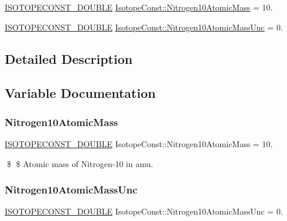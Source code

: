 \begin{DoxyCompactItemize}
\item 
\mbox{\hyperlink{group___isotope_const-_macros_ga8f45a7272ce02c0b4c65c44636ed719a}{I\+S\+O\+T\+O\+P\+E\+C\+O\+N\+S\+T\+\_\+\+D\+O\+U\+B\+LE}} \mbox{\hyperlink{group___isotope_const-_nitrogen-_n10_ga37747b6676fe4e88cf44adf99983e192}{Isotope\+Const\+::\+Nitrogen10\+Atomic\+Mass}} = 10.
\item 
\mbox{\hyperlink{group___isotope_const-_macros_ga8f45a7272ce02c0b4c65c44636ed719a}{I\+S\+O\+T\+O\+P\+E\+C\+O\+N\+S\+T\+\_\+\+D\+O\+U\+B\+LE}} \mbox{\hyperlink{group___isotope_const-_nitrogen-_n10_gaa5e66ec3d050878abecbff5ad2c30d71}{Isotope\+Const\+::\+Nitrogen10\+Atomic\+Mass\+Unc}} = 0.
\end{DoxyCompactItemize}


\subsection{Detailed Description}


\subsection{Variable Documentation}
\mbox{\label{group___isotope_const-_nitrogen-_n10_ga37747b6676fe4e88cf44adf99983e192}} 
\subsubsection{\texorpdfstring{Nitrogen10\+Atomic\+Mass}{Nitrogen10AtomicMass}}
{\footnotesize\ttfamily \mbox{\hyperlink{group___isotope_const-_macros_ga8f45a7272ce02c0b4c65c44636ed719a}{I\+S\+O\+T\+O\+P\+E\+C\+O\+N\+S\+T\+\_\+\+D\+O\+U\+B\+LE}} Isotope\+Const\+::\+Nitrogen10\+Atomic\+Mass = 10.}

\$ \$ Atomic mass of Nitrogen-\/10 in amu. \mbox{\label{group___isotope_const-_nitrogen-_n10_gaa5e66ec3d050878abecbff5ad2c30d71}} 
\subsubsection{\texorpdfstring{Nitrogen10\+Atomic\+Mass\+Unc}{Nitrogen10AtomicMassUnc}}
{\footnotesize\ttfamily \mbox{\hyperlink{group___isotope_const-_macros_ga8f45a7272ce02c0b4c65c44636ed719a}{I\+S\+O\+T\+O\+P\+E\+C\+O\+N\+S\+T\+\_\+\+D\+O\+U\+B\+LE}} Isotope\+Const\+::\+Nitrogen10\+Atomic\+Mass\+Unc = 0.}

